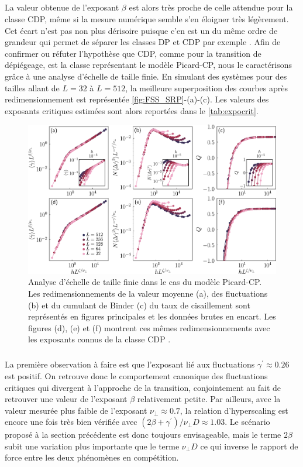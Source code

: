 \subparagraph{}La valeur obtenue de l'exposant $\beta$ est alors très proche de celle attendue pour la classe CDP, même si la mesure numérique semble s'en éloigner très légèrement. Cet écart n'est pas non plus dérisoire puisque c'en est un du même ordre de grandeur qui permet de séparer les classes DP et CDP par exemple \cite{lubeck_universal_2004}. Afin de confirmer ou réfuter l'hypothèse que CDP, comme pour la transition de dépiégeage, est la classe représentant le modèle Picard-CP, nous le caractérisons grâce à une analyse d'échelle de taille finie. En simulant des systèmes pour des tailles allant de $L=32$ à $L=512$, la meilleure superposition des courbes après redimensionnement est représentée \autoref{fig:FSS_SRP}-(a)-(c). Les valeurs des exposants critiques estimées sont alors reportées dans le \autoref{tab:expocrit}.

\begin{figure}[h]
	\centering
	\includegraphics[width=\textwidth]{Chapitre4/Figures/CourtePortee/FSS_SRP_edited.pdf}
	\caption{Analyse d'échelle de taille finie dans le cas du modèle Picard-CP. Les redimensionnements de la valeur moyenne (a), des fluctuations (b) et du cumulant de Binder (c) du taux de cisaillement sont représentés en figures principales et les données brutes en encart. Les figures (d), (e) et (f) montrent ces mêmes redimensionnements avec les exposants connus de la classe CDP \cite{lubeck_universal_2004}.}
	\label{fig:FSS_SRP}
\end{figure}

\subparagraph{} La première observation à faire est que l'exposant lié aux fluctuations $\gamma^\prime \approx 0.26$ est positif. On retrouve donc le comportement canonique des fluctuations critiques qui divergent à l'approche de la transition, conjointement au fait de retrouver une valeur de l'exposant $\beta$ relativement petite. Par ailleurs, avec la valeur mesurée plus faible de l'exposant $\nu_\perp \approx 0.7$, la relation d'hyperscaling est encore une fois très bien vérifiée avec $(2\beta + \gamma^\prime)/\nu_\perp D \approx 1.03$. Le scénario proposé à la section précédente est donc toujours envisageable, mais le terme $2\beta$ subit une variation plus importante que le terme $\nu_\perp D$ ce qui inverse le rapport de force entre les deux phénomènes en compétition.

